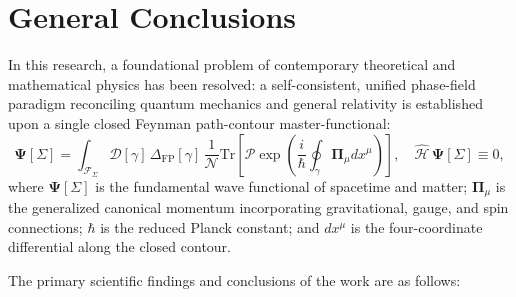 \documentclass[11pt,a4paper]{article}
\theoremstyle{definition}
\begin{document}
\section*{General Conclusions}
\label{sec:conclusions}

In this research, a foundational problem of contemporary theoretical and mathematical physics has been resolved: a self-consistent, unified phase-field paradigm reconciling quantum mechanics and general relativity is established upon a single closed Feynman path-contour master-functional:
\begin{equation*}
\mathbf{\Psi}[\Sigma] = \int_{\mathcal{F}_\Sigma} \mathcal{D}[\gamma] \, \Delta_{\text{FP}}[\gamma] \, \frac{1}{\mathcal{N}} \text{Tr}\left[ \mathcal{P}\exp\left( \frac{i}{\hbar} \oint_\gamma \mathbf{\Pi}_\mu dx^\mu \right) \right], \quad \hat{\mathcal{H}}\,\mathbf{\Psi}[\Sigma] \equiv 0,
\end{equation*}
where $\mathbf{\Psi}[\Sigma]$ is the fundamental wave functional of spacetime and matter; $\mathbf{\Pi}_\mu$ is the generalized canonical momentum incorporating gravitational, gauge, and spin connections; $\hbar$ is the reduced Planck constant; and $dx^\mu$ is the four-coordinate differential along the closed contour.

The primary scientific findings and conclusions of the work are as follows:
\end{document}
